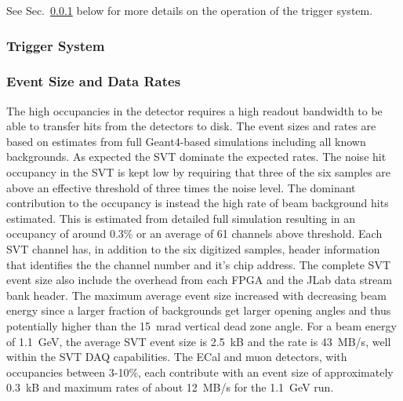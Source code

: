 See Sec.~\ref{sec:triggerdaq} below for more details on the operation of the trigger system.






\subsubsection{Trigger System}
\label{sec:triggerdaq}


\subsubsection{Event Size and Data Rates}

The high occupancies in the detector requires a high readout bandwidth to be able to transfer hits from the 
detectors to disk. The event sizes and rates are based on estimates from full Geant4-based simulations 
including all known backgrounds. As expected the SVT dominate the expected rates. 
The noise hit occupancy in the SVT is kept low by requiring that three of the six samples are above an
effective threshold of three times the noise level. The dominant contribution to the occupancy is instead 
the high rate of beam background hits estimated. This is estimated 
from detailed full simulation resulting in an occupancy of around 0.3\% or an average of 61 channels above threshold.  
Each SVT channel has, in addition to the six digitized samples,  header information that identifies the 
the channel number and it's chip address. The complete SVT event size also 
include the overhead from each FPGA and the JLab data stream bank header.  
The maximum average event size increased with decreasing beam energy since a larger 
fraction of backgrounds get larger opening angles and thus potentially higher than the 15~mrad 
vertical dead zone angle. For a beam energy of 1.1~GeV, the average SVT event size is 2.5~kB and 
the rate is 43~MB/s, well within the SVT DAQ capabilities. 
The ECal and muon detectors, with occupancies between 3-10\%, each contribute with an event size of 
approximately 0.3~kB and maximum rates of about 12~MB/s for the 1.1~GeV run. 
